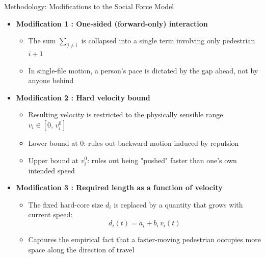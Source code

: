 \documentclass{beamer}
\begin{document}
\begin{frame}{Methodology: Modifications to the Social Force Model}
    \begin{itemize}
        \item \textbf{Modification 1 : One-sided (forward-only) interaction}
        \begin{itemize}
            \item The sum $\sum_{j\neq i}$ is collapsed into a single term involving only pedestrian $i+1$
            \item In single-file motion, a person's pace is dictated by the gap ahead, not by anyone behind
        \end{itemize}
        \item \textbf{Modification 2 : Hard velocity bound}
        \begin{itemize}
            \item Resulting velocity is restricted to the physically sensible range $v_i \in [0,\, v_i^0]$
            \item Lower bound at $0$: rules out backward motion induced by repulsion
            \item Upper bound at $v_i^0$: rules out being "pushed" faster than one's own intended speed
        \end{itemize}
        \item \textbf{Modification 3 : Required length as a function of velocity}
        \begin{itemize}
            \item The fixed hard-core size $d_i$ is replaced by a quantity that grows with current speed:
            \[
                d_i(t) = a_i + b_i\, v_i(t)
            \]
            \item Captures the empirical fact that a faster-moving pedestrian occupies more space along the direction of travel
        \end{itemize}
    \end{itemize}
\end{frame}
\end{document}
